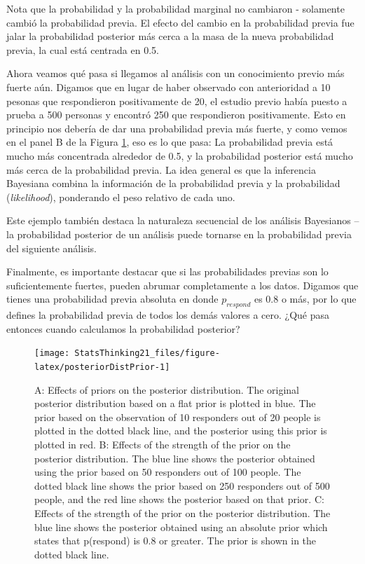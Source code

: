 \documentclass[
  12pt,
]{book}
\begin{document}
Nota que la probabilidad y la probabilidad marginal no cambiaron - solamente cambió la probabilidad previa. El efecto del cambio en la probabilidad previa fue jalar la probabilidad posterior más cerca a la masa de la nueva probabilidad previa, la cual está centrada en 0.5.

Ahora veamos qué pasa si llegamos al análisis con un conocimiento previo más fuerte aún. Digamos que en lugar de haber observado con anterioridad a 10 pesonas que respondieron positivamente de 20, el estudio previo había puesto a prueba a 500 personas y encontró 250 que respondieron positivamente. Esto en principio nos debería de dar una probabilidad previa más fuerte, y como vemos en el panel B de la Figura \ref{fig:posteriorDistPrior}, eso es lo que pasa: La probabilidad previa está mucho más concentrada alrededor de 0.5, y la probabilidad posterior está mucho más cerca de la probabilidad previa. La idea general es que la inferencia Bayesiana combina la información de la probabilidad previa y la probabilidad (\emph{likelihood}), ponderando el peso relativo de cada uno.

Este ejemplo también destaca la naturaleza secuencial de los análisis Bayesianos -- la probabilidad posterior de un análisis puede tornarse en la probabilidad previa del siguiente análisis.

Finalmente, es importante destacar que si las probabilidades previas son lo suficientemente fuertes, pueden abrumar completamente a los datos. Digamos que tienes una probabilidad previa absoluta en donde \(p_{respond}\) es 0.8 o más, por lo que defines la probabilidad previa de todos los demás valores a cero. ¿Qué pasa entonces cuando calculamos la probabilidad posterior?

\begin{figure}
\texttt{[image: StatsThinking21\_files/figure-latex/posteriorDistPrior-1]} \caption{A: Effects of priors on the posterior distribution.  The original posterior distribution based on a flat prior is plotted in blue. The prior based on the observation of 10 responders out of 20 people is plotted in the dotted black line, and the posterior using this prior is plotted in red.  B: Effects of the strength of the prior on the posterior distribution. The blue line shows the posterior obtained using the prior based on 50 responders out of 100 people.  The dotted black line shows the prior based on 250 responders out of 500 people, and the red line shows the posterior based on that prior. C: Effects of the strength of the prior on the posterior distribution. The blue line shows the posterior obtained using an absolute prior which states that p(respond) is 0.8 or greater.  The prior is shown in the dotted black line.}\label{fig:posteriorDistPrior}
\end{figure}
\end{document}
